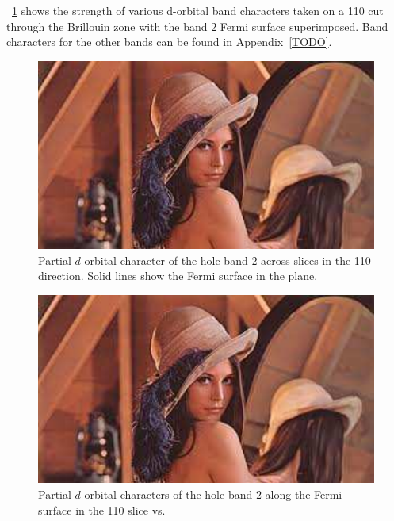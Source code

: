 \Fig~\ref{Fig:3:Band2DCharacter} shows the strength of various d-orbital band characters taken on a 110 cut through the \BaFeP Brillouin zone with the band $2$ Fermi surface superimposed. Band characters for the other bands can be found in Appendix~\ref{TODO}.
\begin{figure}[h!]
    \begin{center}
        \includegraphics[scale=0.7]{Misc/TODO}
        \caption{Partial $d$-orbital character of the hole band $2$ across slices in the 110 direction. Solid lines show the Fermi surface in the plane.}
        \label{Fig:3:Band2DCharacter}
    \end{center}
\end{figure}
\begin{figure}[h!]
    \begin{center}
        \includegraphics[scale=0.7]{Misc/TODO}
        \caption{Partial $d$-orbital characters of the hole band $2$ along the Fermi surface in the 110 slice vs. \kz}
        \label{Fig:3:Band2DCharacterVsKz}
    \end{center}
\end{figure}

